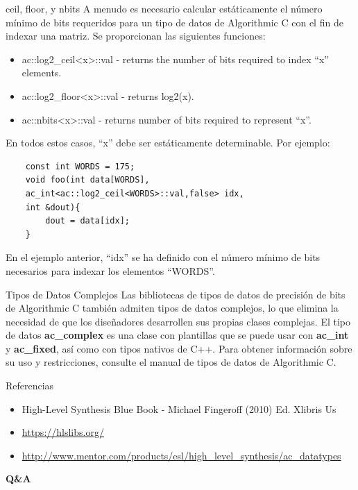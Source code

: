 \documentclass[11pt]{beamer}
\begin{document}
	\begin{frame}[fragile]{ceil, floor, y nbits}
	\justifying \footnotesize
	A menudo es necesario calcular estáticamente el número mínimo de bits requeridos para un tipo de datos de Algorithmic C con el fin de indexar una matriz. Se proporcionan las siguientes funciones:
	\begin{itemize}
		\item ac::log2\_ceil<x>::val - returns the number of bits required to index ``x'' elements.
		\item ac::log2\_floor<x>::val - returns log2(x).
		\item ac::nbits<x>::val - returns number of bits required to represent ``x''.
	\end{itemize}
	En todos estos casos, ``x'' debe ser estáticamente determinable. Por ejemplo:
	\begin{lstlisting}
	const int WORDS = 175;
	void foo(int data[WORDS],
	ac_int<ac::log2_ceil<WORDS>::val,false> idx,
	int &dout){
		dout = data[idx];
	}
	\end{lstlisting}
	En el ejemplo anterior, ``idx'' se ha definido con el número mínimo de bits necesarios para indexar los elementos ``WORDS''.
	\end{frame}
	
	\begin{frame}{Tipos de Datos Complejos}
	Las bibliotecas de tipos de datos de precisión de bits de Algorithmic C también admiten tipos de datos complejos, lo que elimina la necesidad de que los diseñadores desarrollen sus propias clases complejas. El tipo de datos \textbf{ac\_complex} es una clase con plantillas que se puede usar con \textbf{ac\_int} y \textbf{ac\_fixed}, así como con tipos nativos de C++. Para obtener información sobre su uso y restricciones, consulte el manual de tipos de datos de Algorithmic C.
	\end{frame}

	\begin{frame}{Referencias}
	\begin{itemize}
		\item High-Level Synthesis Blue Book -  Michael Fingeroff (2010) Ed. Xlibris Us
		\item \url{https://hlslibs.org/}
		\item \url{http://www.mentor.com/products/esl/high_level_synthesis/ac_datatypes}
	\end{itemize}
	\end{frame}
	
	\begin{frame}
	\centering
	\Huge \textbf{Q\&A}
	\end{frame}
\end{document}
